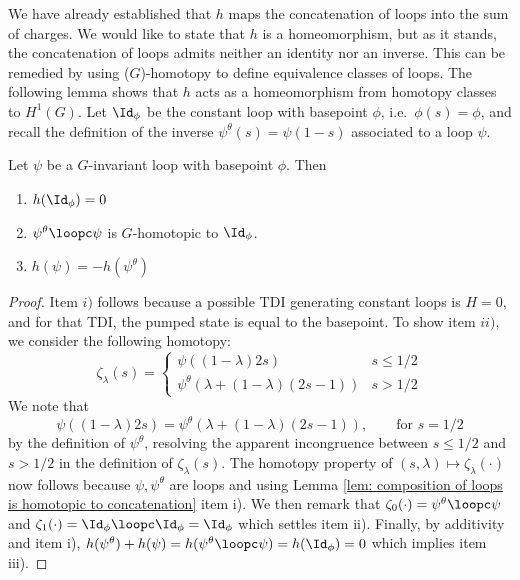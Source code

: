 We have already established that $h$ maps the concatenation of loops into the sum of charges. We would like to state that $h$ is a homeomorphism, but as it stands, the concatenation  of loops admits neither an identity nor an inverse. This can be remedied by using ($G$)-homotopy to define equivalence classes of loops. The following lemma shows that $h$ acts as a homeomorphism from homotopy classes to $H^1(G)$. 
Let $\Id_\phi$ be the constant loop with basepoint $\phi$, i.e.\ $\phi(s)=\phi$, and recall the definition of the inverse ${\psi^{\theta}}(s)=\psi(1-s)$ associated to a loop  $\psi$.
\begin{lemma}\label{lem: inverse loop}
	Let $\psi$ be a $G$-invariant loop with basepoint $\phi$. Then
	\begin{enumerate}
		\item $h(\Id_\phi)=0$
		\item  ${\psi^{\theta}}\loopc\psi$ is $G$-homotopic to $\Id_\phi$.
		\item $h(\psi)=-h({\psi^{\theta}})$
	\end{enumerate}
\end{lemma}
\begin{proof}
	Item $i)$ follows because a possible TDI generating constant loops is $H=0$, and for that TDI, the pumped state is equal to the basepoint. 
	To show item $ii)$, we consider the following homotopy:
	\begin{equation}
		\zeta_\lambda(s) = \begin{cases} \psi((1-\lambda)2s) &  s\leq 1/2 \\
			{\psi^{\theta}}(\lambda+(1-\lambda)(2s-1))  &  s >1/2
		\end{cases}
	\end{equation}
	We note that
	$$
	\psi((1-\lambda) 2s)=  {\psi^{\theta}}(\lambda+(1-\lambda)(2s-1)), \qquad \text{for $s=1/2$}
	$$
	by the definition of ${\psi^{\theta}}$, resolving the apparent incongruence between $s\leq 1/2$ and $s>1/2$ in the definition of $\zeta_\lambda(s)$. 
	The homotopy property of $(s,\lambda)\mapsto \zeta_\lambda(\cdot)$ now follows because $\psi,{\psi^{\theta}}$ are loops and using Lemma \ref{lem: composition of loops is homotopic to concatenation} item i). 
	We then remark that $\zeta_0(\cdot)= {\psi^{\theta}}\loopc\psi$ and $\zeta_1(\cdot)= \Id_\phi\loopc\Id_\phi=\Id_\phi$ which settles item ii). Finally, by additivity and item i), $
	h({\psi^{\theta}})+h(\psi)= h({\psi^{\theta}}\loopc\psi)= h(\Id_\phi)= 0
	$
	which implies item iii). 
\end{proof}



